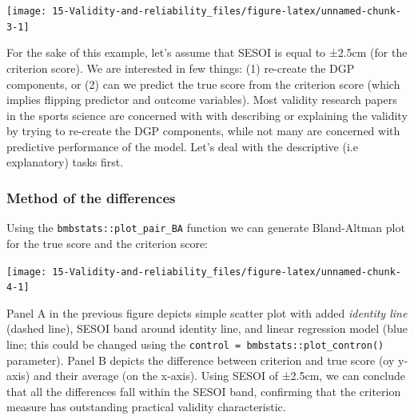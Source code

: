 \documentclass[
]{book}
\newenvironment{Shaded}{\begin{snugshade}}{\end{snugshade}}
\newcommand{\DataTypeTok}[1]{\textcolor[rgb]{0.13,0.29,0.53}{#1}}
\newcommand{\FloatTok}[1]{\textcolor[rgb]{0.00,0.00,0.81}{#1}}
\newcommand{\KeywordTok}[1]{\textcolor[rgb]{0.13,0.29,0.53}{\textbf{#1}}}
\newcommand{\NormalTok}[1]{#1}
\newcommand{\OperatorTok}[1]{\textcolor[rgb]{0.81,0.36,0.00}{\textbf{#1}}}
\newcommand{\StringTok}[1]{\textcolor[rgb]{0.31,0.60,0.02}{#1}}
\begin{document}
\begin{center}\texttt{[image: 15-Validity-and-reliability\_files/figure-latex/unnamed-chunk-3-1]} \end{center}

For the sake of this example, let's assume that SESOI is equal to ±2.5cm (for the criterion score). We are interested in few things: (1) re-create the DGP components, or (2) can we predict the true score from the criterion score (which implies flipping predictor and outcome variables). Most validity research papers in the sports science are concerned with with describing or explaining the validity by trying to re-create the DGP components, while not many are concerned with predictive performance of the model. Let's deal with the descriptive (i.e explanatory) tasks first.

\hypertarget{method-of-the-differences}{%
\subsubsection{Method of the differences}\label{method-of-the-differences}}

Using the \texttt{bmbstats::plot\_pair\_BA} function we can generate Bland-Altman plot for the true score and the criterion score:

\begin{Shaded}
\end{Shaded}

\begin{center}\texttt{[image: 15-Validity-and-reliability\_files/figure-latex/unnamed-chunk-4-1]} \end{center}

Panel A in the previous figure depicts simple scatter plot with added \emph{identity line} (dashed line), SESOI band around identity line, and linear regression model (blue line; this could be changed using the \texttt{control\ =\ bmbstats::plot\_contron()} parameter). Panel B depicts the difference between criterion and true score (oy y-axis) and their average (on the x-axis). Using SESOI of ±2.5cm, we can conclude that all the differences fall within the SESOI band, confirming that the criterion measure has outstanding practical validity characteristic.
\end{document}

